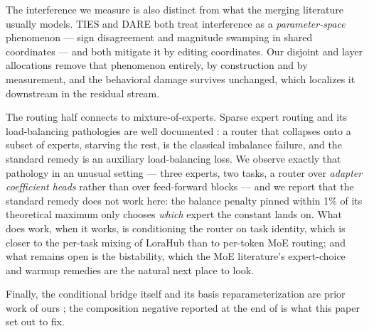 \documentclass[11pt]{article}
\begin{document}
The interference we measure is also distinct from what the merging literature usually models. TIES and DARE both treat interference as a \emph{parameter-space} phenomenon --- sign disagreement and magnitude swamping in shared coordinates --- and both mitigate it by editing coordinates. Our disjoint and layer allocations remove that phenomenon entirely, by construction and by measurement, and the behavioral damage survives unchanged, which localizes it downstream in the residual stream.

The routing half connects to mixture-of-experts. Sparse expert routing and its load-balancing pathologies are well documented \cite{shazeer2017moe,fedus2022switch}: a router that collapses onto a subset of experts, starving the rest, is the classical imbalance failure, and the standard remedy is an auxiliary load-balancing loss. We observe exactly that pathology in an unusual setting --- three experts, two tasks, a router over \emph{adapter coefficient heads} rather than over feed-forward blocks --- and we report that the standard remedy does not work here: the balance penalty pinned within 1\% of its theoretical maximum only chooses \emph{which} expert the constant lands on. What does work, when it works, is conditioning the router on task identity, which is closer to the per-task mixing of LoraHub than to per-token MoE routing; and what remains open is the bistability, which the MoE literature's expert-choice and warmup remedies are the natural next place to look.

Finally, the conditional bridge itself and its basis reparameterization are prior work of ours \cite{penov2026bridges,penov2026note,penov2026basis}; the composition negative reported at the end of \cite{penov2026basis} is what this paper set out to fix.
\end{document}
